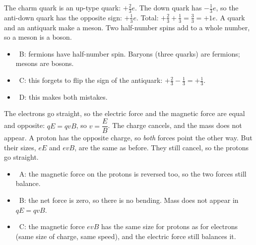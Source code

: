 \begin{practiceanswers}
\begin{practiceans}
  The charm quark is an up-type quark: $+\tfrac23 e$. The down quark has $-\tfrac13 e$, so
  the anti-down quark has the opposite sign: $+\tfrac13 e$. Total:
  $+\tfrac23 + \tfrac13 = \tfrac33 = +1e$. A quark and an antiquark make a meson. Two
  half-number spins add to a whole number, so a meson is a boson.
  \begin{itemize}
    \item \xmark\ B: fermions have half-number spin. Baryons (three quarks) are fermions;
          mesons are bosons.
    \item \xmark\ C: this forgets to flip the sign of the antiquark:
          $+\tfrac23 - \tfrac13 = +\tfrac13$.
    \item \xmark\ D: this makes both mistakes.
  \end{itemize}
\end{practiceans}

\begin{practiceans}
  The electrons go straight, so the electric force and the magnetic force are equal and
  opposite: $qE = qvB$, so $v = \dfrac{E}{B}$. The charge cancels, and the mass does not
  appear. A proton has the opposite charge, so \emph{both} forces point the other way. But
  their sizes, $eE$ and $evB$, are the same as before. They still cancel, so the protons go
  straight.
  \begin{itemize}
    \item \xmark\ A: the magnetic force on the protons is reversed too, so the two forces
          still balance.
    \item \xmark\ B: the net force is zero, so there is no bending. Mass does not appear in
          $qE = qvB$.
    \item \xmark\ C: the magnetic force $evB$ has the same size for protons as for electrons
          (same size of charge, same speed), and the electric force still balances it.
  \end{itemize}
\end{practiceans}


\end{practiceanswers}
